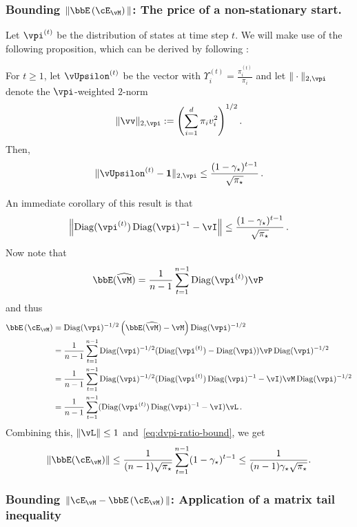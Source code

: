 \subsubsection{Bounding $\norm{\EE{\errm}}$: The price of a non-stationary start.}
Let $\vpi^{(t)}$ be the distribution of states at time step $t$.
We will make use of the following proposition, which can be derived by
following \citet[Proposition 1.12]{MoTe06}:
\begin{proposition}
For $t\ge 1$, let $\vUpsilon^{(t)}$ be the vector with $\Upsilon^{(t)}_i= \frac{\pi_i^{(t)}}{\pi_i}$ and let
$\norm{\cdot}_{2,\vpi}$ denote the $\vpi$-weighted $2$-norm
\begin{align}
\label{eq:vv}
  \norm{\vv}_{2,\vpi} := \Parens{ \sum_{i=1}^d \pi_i v_i^2 }^{1/2}
  .
\end{align}
 Then,
\begin{equation}
  \label{eq:L2-contraction}
  \norm{ \vUpsilon^{(t)} - \v1 }_{2,\vpi} \leq
  \frac{(1-\gap)^{t-1}}{\sqrt{\pimin}} \,.
\end{equation}
\end{proposition}
An immediate corollary of this result is that 
\begin{align}
\label{eq:dvpi-ratio-bound}
\Norm{  \Dvpit \Dvpi^{-1} - \vI  } \le \frac{(1-\gap)^{t-1}}{\sqrt{\pimin}}\,.
\end{align}
Now note that
\begin{align*}
\bbE (\wh\vM) = \frac{1}{n-1} \sum_{t=1}^{n-1} \Dvpit \vP\,
\end{align*}
and thus
\begin{align*}
\EE{\errm} &=
  \Dvpi^{-1/2}
  \left(\bbE( \wh\vM )- \vM\right)
  \Dvpi^{-1/2}\\
& =  
  \frac{1}{n-1} \sum_{t=1}^{n-1}
  \Dvpi^{-1/2} (\Dvpit  - \Dvpi) \vP \Dvpi^{-1/2} \\
& =  
  \frac{1}{n-1} \sum_{t=1}^{n-1}
  \Dvpi^{-1/2} (\Dvpit \Dvpi^{-1} - \vI) \vM \Dvpi^{-1/2} \\
& =  
  \frac{1}{n-1} \sum_{t=1}^{n-1}
   (\Dvpit \Dvpi^{-1} - \vI) \vL \,.
\end{align*}
Combining this, $\norm{\vL}\le 1$ and~\cref{eq:dvpi-ratio-bound}, we get
\begin{align}
  \norm{\bbE(\errm)}
  \le \frac{1}{(n-1)\sqrt{\pimin}} \sum_{t=1}^{n-1} (1-\gap)^{t-1}
  \le \frac{1}{(n-1)\gap\sqrt{\pimin}}
  .
  \label{eq:biasbound}
\end{align}

\subsubsection{
Bounding $\norm{\errm-\EE{\errm}}$: 
Application of a matrix tail inequality}
\label{sec:pairwise-tailbound}

